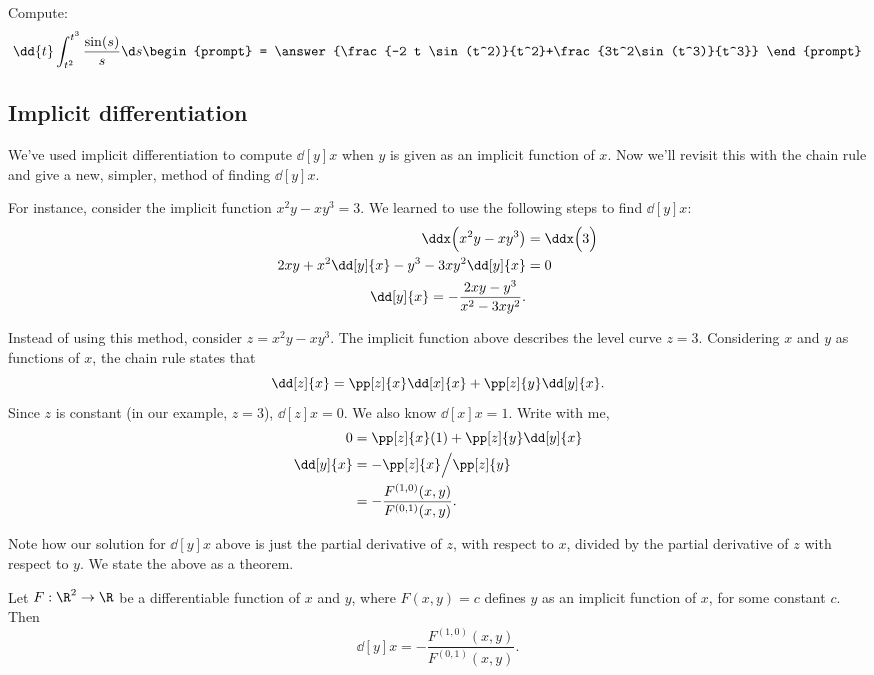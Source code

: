 \documentclass{ximera}
\begin{document}
\begin{question}
  Compute:
  \[
  \dd{t} \int_{t^2}^{t^3} \frac{\sin(s)}{s} \d s
  \begin{prompt}
    = \answer{\frac{-2 t \sin(t^2)}{t^2}+\frac{3t^2\sin(t^3)}{t^3}}
  \end{prompt}
  \]
\end{question}




\subsection{Implicit differentiation}

We've used implicit differentiation to compute $\dd[y]{x}$ when $y$ is
given as an implicit function of $x$. Now we'll revisit this with the
chain rule and give a new, simpler, method of finding $\dd[y]{x}$.

For instance, consider the implicit function $x^2y-xy^3=3$. We learned
to use the following steps to find $\dd[y]{x}$:
\begin{align*}
\ddx\Big(x^2y-xy^3\big) &= \ddx\Big(3\Big) \\
2xy + x^2\dd[y]{x}-y^3-3xy^2\dd[y]{x} &= 0\\
\dd[y]{x} = -\frac{2xy-y^3}{x^2-3xy^2}.
\end{align*}
     
Instead of using this method, consider $z=x^2y-xy^3$. The implicit
function above describes the level curve $z=3$. Considering $x$ and
$y$ as functions of $x$, the chain rule states that
\[
\dd[z]{x} = \pp[z]{x}\dd[x]{x}+\pp[z]{y}\dd[y]{x}.
\]
Since $z$ is constant (in our example, $z=3$), $\dd[z]{x} = 0$. We
also know $\dd[x]{x} = 1$. Write with me,
\begin{align*}
  0 &= \pp[z]{x}(1) + \pp[z]{y}\dd[y]{x} \\
  \dd[y]{x} &= -\pp[z]{x}\Big/\pp[z]{y}\\
  &= -\frac{F^{(1,0)}(x,y)}{F^{(0,1)}(x,y)}.
\end{align*}

Note how our solution for $\dd[y]{x}$ above is just the partial
derivative of $z$, with respect to $x$, divided by the partial
derivative of $z$ with respect to $y$.  We state the above as a
theorem.

\begin{theorem}
  Let $F:\R^2\to\R$ be a differentiable function of $x$ and $y$, where
  $F(x,y)=c$ defines $y$ as an implicit function of $x$, for some
  constant $c$. Then 
  \[
  \dd[y]{x} = -\frac{F^{(1,0)}(x,y)}{F^{(0,1)}(x,y)}.
  \]
\end{theorem}
\end{document}
